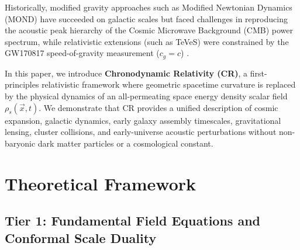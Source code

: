 \documentclass[aps,prd,reprint,superscriptaddress,nofootinbib,floatfix,amsmath,amssymb]{revtex4-2}
\begin{document}
Historically, modified gravity approaches such as Modified Newtonian Dynamics (MOND) \cite{McGaugh2016_RAR} have succeeded on galactic scales but faced challenges in reproducing the acoustic peak hierarchy of the Cosmic Microwave Background (CMB) power spectrum, while relativistic extensions (such as TeVeS) were constrained by the GW170817 speed-of-gravity measurement ($c_g = c$) \cite{GW170817}.

In this paper, we introduce \textbf{Chronodynamic Relativity (CR)}, a first-principles relativistic framework where geometric spacetime curvature is replaced by the physical dynamics of an all-permeating space energy density scalar field $\rho_s(\vec{x}, t)$. We demonstrate that CR provides a unified description of cosmic expansion, galactic dynamics, early galaxy assembly timescales, gravitational lensing, cluster collisions, and early-universe acoustic perturbations without non-baryonic dark matter particles or a cosmological constant.

\section{Theoretical Framework}
\label{sec:theory}

\subsection{Tier 1: Fundamental Field Equations and Conformal Scale Duality}
\label{sec:tier1_theory}
\end{document}
